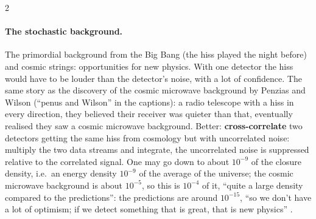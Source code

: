 \begin{paracol}{2}
\paragraph{The stochastic background.} The primordial background from the Big Bang (the hiss played the night before) and cosmic strings: opportunities for new physics. With one detector the hiss would have to be louder than the detector's noise, with a lot of confidence. The same story as the discovery of the cosmic microwave background by Penzias and Wilson (``penus and Wilson'' in the captions): a radio telescope with a hiss in every direction, they believed their receiver was quieter than that, eventually realised they saw a cosmic microwave background. Better: \textbf{cross-correlate} two detectors getting the same hiss from cosmology but with uncorrelated noise: multiply the two data streams and integrate, the uncorrelated noise is suppressed relative to the correlated signal. One may go down to about $10^{-9}$ of the closure density, i.e.\ an energy density $10^{-9}$ of the average of the universe; the cosmic microwave background is about $10^{-5}$, so this is $10^{-4}$ of it, ``quite a large density compared to the predictions'': the predictions are around $10^{-15}$, ``so we don't have a lot of optimism; if we detect something that is great, that is new physics'' .


\end{paracol}

